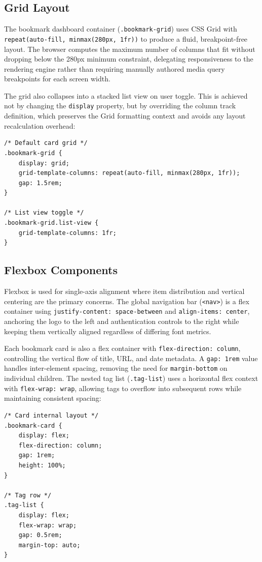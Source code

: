 \documentclass[11pt,a4paper]{book}
\begin{document}
\subsection{Grid Layout}

The bookmark dashboard container (\texttt{.bookmark-grid}) uses CSS Grid with \texttt{repeat(auto-fill, minmax(280px, 1fr))} to produce a fluid, breakpoint-free layout. The browser computes the maximum number of columns that fit without dropping below the 280px minimum constraint, delegating responsiveness to the rendering engine rather than requiring manually authored media query breakpoints for each screen width.

The grid also collapses into a stacked list view on user toggle. This is achieved not by changing the \texttt{display} property, but by overriding the column track definition, which preserves the Grid formatting context and avoids any layout recalculation overhead:

\begin{verbatim}
/* Default card grid */
.bookmark-grid {
    display: grid;
    grid-template-columns: repeat(auto-fill, minmax(280px, 1fr));
    gap: 1.5rem;
}

/* List view toggle */
.bookmark-grid.list-view {
    grid-template-columns: 1fr;
}
\end{verbatim}

\subsection{Flexbox Components}

Flexbox is used for single-axis alignment where item distribution and vertical centering are the primary concerns. The global navigation bar (\texttt{<nav>}) is a flex container using \texttt{justify-content: space-between} and \texttt{align-items: center}, anchoring the logo to the left and authentication controls to the right while keeping them vertically aligned regardless of differing font metrics.

Each bookmark card is also a flex container with \texttt{flex-direction: column}, controlling the vertical flow of title, URL, and date metadata. A \texttt{gap: 1rem} value handles inter-element spacing, removing the need for \texttt{margin-bottom} on individual children. The nested tag list (\texttt{.tag-list}) uses a horizontal flex context with \texttt{flex-wrap: wrap}, allowing tags to overflow into subsequent rows while maintaining consistent spacing:

\begin{verbatim}
/* Card internal layout */
.bookmark-card {
    display: flex;
    flex-direction: column;
    gap: 1rem;
    height: 100%;
}

/* Tag row */
.tag-list {
    display: flex;
    flex-wrap: wrap;
    gap: 0.5rem;
    margin-top: auto;
}
\end{verbatim}
\end{document}
